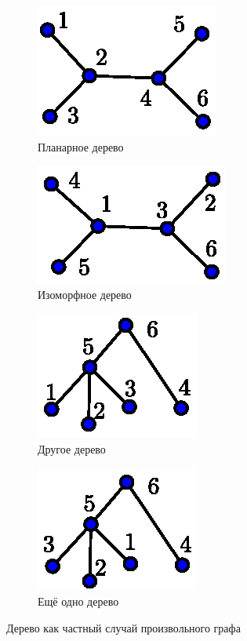 \documentclass{article}
\theoremstyle{definition}
\begin{document}
\begin{figure}[h]
\centering
\begin{subfigure}{.22\textwidth}
   	\centering
	\includegraphics[width=.5\textwidth]{planar_nonrooted.eps}
	\caption{Планарное дерево}
	\label{fig:planar_1}	
\end{subfigure}%
\begin{subfigure}{.22\textwidth}
	\centering
	\includegraphics[width=.5\textwidth]{planar_nonrooted_2.eps}
	\caption{Изоморфное дерево}
	\label{fig:planar_2}	
\end{subfigure}%
\begin{subfigure}{.22\textwidth}
	\centering
	\includegraphics[width=.5\textwidth]{planar_nonrooted_3.eps}
	\caption{Другое дерево}
	\label{fig:planar_3}	
\end{subfigure}%
\begin{subfigure}{.22\textwidth}
	\centering
	\includegraphics[width=.5\textwidth]{planar_nonrooted_4.eps}
	\caption{Ещё одно дерево}
	\label{fig:planar_4}	
\end{subfigure}
\caption{Дерево как частный случай произвольного графа}
\end{figure}
\end{document}
